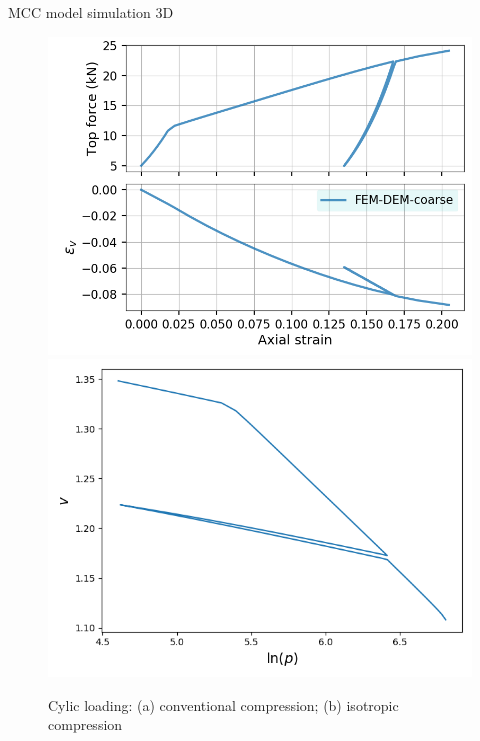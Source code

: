 \documentclass[aspectratio=169]{beamer}
\begin{document}
\begin{frame}{MCC model simulation 3D}
\begin{minipage}{0.48\linewidth}
\begin{figure}
			\centering
			\includegraphics[width=0.48\linewidth]{./pic/mcc/biaxial_cylic_topforce.png}
			\includegraphics[width=0.48\linewidth]{./pic/mcc/cylic_consolidation.png}
			\caption{Cylic loading: (a) conventional compression; (b) isotropic compression}
			\label{fig: mcc cylic loading}
		\end{figure}
	\end{minipage}

\end{frame}
\end{document}
